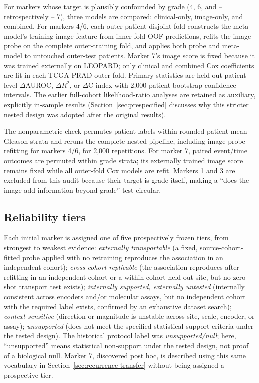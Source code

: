 For markers whose target is plausibly confounded by grade (4, 6, and -- retrospectively -- 7),
three models are compared: clinical-only, image-only, and combined. For markers 4/6, each
outer patient-disjoint fold constructs the meta-model's training image feature from inner-fold
OOF predictions, refits the image probe on the complete outer-training fold, and applies both
probe and meta-model to untouched outer-test patients. Marker 7's image score is fixed because
it was trained externally on LEOPARD; only clinical and combined Cox coefficients are fit in
each TCGA-PRAD outer fold. Primary statistics are held-out patient-level $\Delta$AUROC,
$\Delta R^2$, or $\Delta$C-index with 2{,}000 patient-bootstrap confidence intervals. The
earlier full-cohort likelihood-ratio analyses are retained as auxiliary, explicitly
in-sample results (Section~\ref{sec:prespecified} discusses why this stricter nested design
was adopted after the original results).

The nonparametric check permutes patient labels within rounded patient-mean Gleason strata and
reruns the complete nested pipeline, including image-probe refitting for markers 4/6, for
2{,}000 repetitions. For marker 7, paired event/time outcomes are permuted within grade
strata; its externally trained image score remains fixed while all outer-fold Cox models are
refit. Markers 1 and 3 are excluded from this audit because their target is grade itself,
making a ``does the image add information beyond grade'' test circular.

\subsection{Reliability tiers}

Each initial marker is assigned one of five prospectively frozen tiers, from strongest to
weakest evidence: \emph{externally transportable} (a fixed, source-cohort-fitted probe applied
with no retraining reproduces the association in an independent cohort); \emph{cross-cohort
replicable} (the association reproduces after refitting in an independent cohort or a
within-cohort held-out site, but no zero-shot transport test exists); \emph{internally
supported, externally untested} (internally consistent across encoders and/or molecular
assays, but no independent cohort with the required label exists, confirmed by an exhaustive
dataset search); \emph{context-sensitive} (direction or magnitude is unstable across site,
scale, encoder, or assay); \emph{unsupported} (does not meet the specified statistical support
criteria under the tested design). The historical protocol label was \emph{unsupported/null};
here, ``unsupported'' means statistical non-support under the tested design, not proof of a
biological null. Marker 7, discovered post hoc, is described using this same vocabulary in
Section~\ref{sec:recurrence-transfer} without being assigned a prospective tier.

